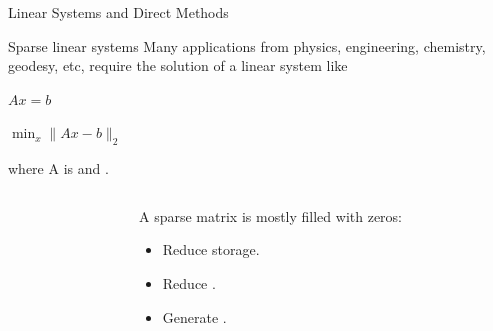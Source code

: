 \begin{frame}{Linear Systems and Direct Methods}
  

  \vspace{-0.2cm}

  \begin{center}

    \begin{block}{Sparse linear systems}
      Many applications from physics, engineering, chemistry, geodesy,
      etc, require the solution of a linear system like

      \vspace{0.2cm}

      $Ax = b$

      \vspace{0.1cm}

      $\min_x \|Ax-b\|_2$


      \vspace{0.2cm}

      where A is  and .
    \end{block}
    
    \vspace{0.3cm}

    \begin{columns}
      \begin{column}{0.05\textwidth}
      \end{column}
      \begin{column}{0.7\textwidth}
        
          
          A sparse matrix is mostly filled with zeros:
          \begin{itemize}
          \item Reduce  storage.
          \item Reduce .
          \item Generate .
          \end{itemize}
          

\end{column}
\end{columns}
\end{center}
\end{frame}
